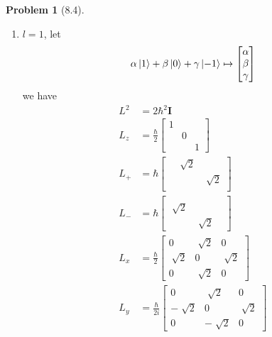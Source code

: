 \documentclass[twoside,11pt]{article}
\theoremstyle{definition}
\newtheorem{problem}{Problem}
\theoremstyle{remark}
\begin{document}
\begin{problem}[8.4]
\begin{enumerate}[label=Case \arabic*., leftmargin=*]
\item $l=1$, let
\begin{align*}
    \alpha\ket{1} + \beta\ket{0} + \gamma\ket{-1}\mapsto
    \begin{bmatrix}
        \alpha\\ \beta\\ \gamma
    \end{bmatrix}
\end{align*}
we have
\begin{align*}
    L^2 &= 2\hbar^2\mathbf{I}\\
    L_z &= \frac{\hbar}{2}\begin{bmatrix}
        1 & & \\
        & 0 & \\
        & & 1
    \end{bmatrix}\\
    L_+ &= \hbar\begin{bmatrix}
        & \sqrt[]{2} & \\
        & & \sqrt[]{2}\\
        & & 
    \end{bmatrix}\\
    L_- &= \hbar\begin{bmatrix}
        & & \\
        \sqrt[]{2} & & \\
        & \sqrt[]{2} & 
    \end{bmatrix}\\
    L_x &= \frac{\hbar}{2}\begin{bmatrix}
        0 & \sqrt[]{2} & 0\\
        \sqrt[]{2} & 0 & \sqrt[]{2}\\
        0 & \sqrt[]{2} & 0
    \end{bmatrix}\\
    L_y &= \frac{\hbar}{2i}\begin{bmatrix}
        0 & \sqrt[]{2} & 0\\
        -\sqrt[]{2} & 0 & \sqrt[]{2}\\
        0 & -\sqrt[]{2} & 0
    \end{bmatrix}
\end{align*}



\end{enumerate}
\end{problem}
\end{document}
